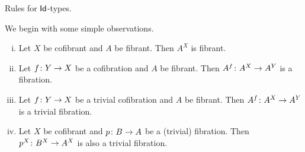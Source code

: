 \documentclass[reqno,10pt,a4paper,oneside,draft]{amsart}
\begin{document}
\begin{table}[htb]
\medskip
\caption{Rules for $\mathsf{Id}$-types.} 
\label{tab:Id-types}
\end{table}


We begin with some simple observations.




\begin{lemma} \hfill 
 \label{thm:exponentials}
\begin{enumerate}[(i)] 
\item Let $X$ be cofibrant and $A$ be fibrant.  Then $A^X$ is fibrant.
\item Let $f \colon Y \rightarrow X$ be a cofibration and $A$ be fibrant. Then $A^f \colon A^X \rightarrow A^Y$ is a fibration.
\item Let $f \colon Y \rightarrow X$ be a trivial cofibration and $A$ be fibrant.  Then $A^f \colon A^X \rightarrow A^Y$ is a trivial fibration.
\item Let $X$ be cofibrant and $p \colon B \rightarrow A$ be a (trivial) fibration. Then $p^X \colon B^X \rightarrow A^X$ is also a trivial fibration.
\end{enumerate}
\end{lemma}
\end{document}
